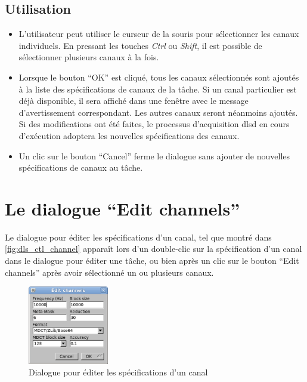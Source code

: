 \documentclass[a4paper,12pt,BCOR6mm,bibtotoc,idxtotoc]{scrbook}
\begin{document}
\subsection{Utilisation}

\begin{itemize}

\item L'utilisateur peut utiliser le curseur de la souris pour
  s\'electionner les canaux individuels.  En pressant les touches
  \textit{Ctrl} ou \textit{Shift}, il est possible de s\'electionner
  plusieurs canaux \`a la fois.

\item Lorsque le bouton ``OK'' est cliqu\'e, tous les canaux
  s\'electionn\'es sont ajout\'es \`a la liste des sp\'ecifications
  de canaux de la t\^ache.  Si un canal particulier est d\'ej\`a
  disponible, il sera affich\'e dans une fen\^etre avec le message
  d'avertissement correspondant. Les autres canaux seront n\'eanmoins
  ajout\'es. Si des modifications ont \'et\'e faites, le processus
  d'acquisition dlsd en cours d'ex\'ecution adoptera les nouvelles
  sp\'ecifications des canaux.

\item Un clic sur le bouton ``Cancel'' ferme le dialogue
  sans ajouter de nouvelles sp\'ecifications de canaux au t\^ache.

\end{itemize}


\section{Le dialogue ``Edit channels''}
\label{sec:manager_channels_edit}

Le dialogue pour \'editer les sp\'ecifications d'un canal,
tel que montr\'e dans \autoref{fig:dls_ctl_channel} appara\^it lors
d'un double-clic sur la sp\'ecification d'un canal dans le
dialogue pour \'editer une t\^ache, ou bien apr\`es un clic sur le
bouton ``Edit channels'' apr\`es avoir s\'electionn\'e un ou plusieurs
canaux.

\begin{figure}[tbh]
  \begin{center}
    \includegraphics[width=100pt]{bilder/ctl_channel_en}
  \end{center}
  \caption{Dialogue pour \'editer les sp\'ecifications d'un canal}
  \label{fig:dls_ctl_channel}
\end{figure}
\end{document}
